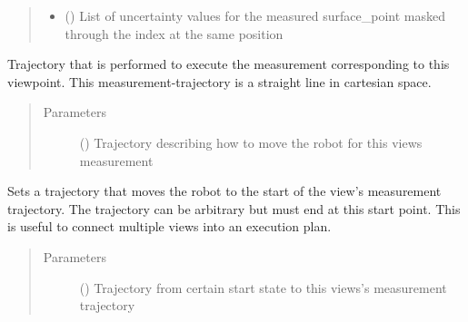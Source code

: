 \documentclass[letterpaper,10pt,english]{sphinxmanual}
\begin{document}
\begin{fulllineitems}
\begin{fulllineitems}
\begin{quote}
\begin{description}
\begin{itemize}
\item {} 
 (\sphinxstyleliteralemphasis{{[}}\sphinxstyleliteralemphasis{{]}}) \textendash{} List of uncertainty values for the measured surface\_point masked through the index at the same position

\end{itemize}

\end{description}\end{quote}

\end{fulllineitems}


\begin{fulllineitems}
\label{\detokenize{module_view:agiprobot_measurement.viewpoint.ViewPoint.set_trajectory_for_measurement}}
Trajectory that is performed to execute the measurement corresponding to this viewpoint.
This measurement-trajectory is a straight line in cartesian space.
\begin{quote}\begin{description}
\item[{Parameters}] \leavevmode
{} () \textendash{} Trajectory describing how to move the robot for this views measurement

\end{description}\end{quote}

\end{fulllineitems}


\begin{fulllineitems}
\label{\detokenize{module_view:agiprobot_measurement.viewpoint.ViewPoint.set_trajectory_to_view}}
Sets a trajectory that moves the robot to the start of the view’s measurement trajectory.
The trajectory can be arbitrary but must end at this start point. This is useful to connect multiple views into an execution plan.
\begin{quote}\begin{description}
\item[{Parameters}] \leavevmode
{} () \textendash{} Trajectory from certain start state to this views’s measurement trajectory


\end{description}
\end{quote}
\end{fulllineitems}
\end{fulllineitems}
\end{document}
